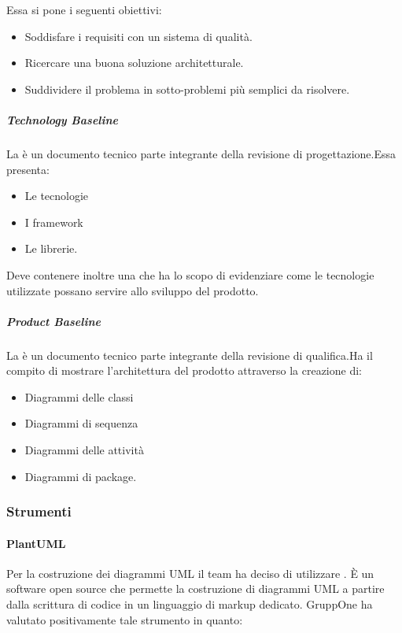 \documentclass[../norme-di-progetto.tex]{subfiles}
\begin{document}
Essa si pone i seguenti obiettivi:
\begin{itemize}
  \item Soddisfare i requisiti con un sistema di qualità.
  \item Ricercare una buona soluzione architetturale.
  \item Suddividere il problema in sotto-problemi più semplici da risolvere.
\end{itemize}

\subparagraph{Technology Baseline}%
\label{subp:technology_baseline}
La  è un documento tecnico parte integrante della revisione di progettazione.\@ Essa presenta:

\begin{itemize}
  \item Le tecnologie
  \item I framework
  \item Le librerie.
\end{itemize}
Deve contenere inoltre una  che ha lo scopo di evidenziare come le tecnologie utilizzate possano servire allo sviluppo del prodotto.

\subparagraph{Product Baseline}%
\label{subp:product_baseline}
La  è un documento tecnico parte integrante della revisione di qualifica.\@ Ha il compito di mostrare l'architettura del prodotto attraverso la creazione di:

\begin{itemize}
  \item Diagrammi delle classi
  \item Diagrammi di sequenza
  \item Diagrammi delle attività
  \item Diagrammi di package.
\end{itemize}

\subsubsection{Strumenti}%
\label{subs:strumenti}

\paragraph{PlantUML}%
\label{par:plantuml}
Per la costruzione dei diagrammi UML il team ha deciso di utilizzare \@.
È un software open source che permette la costruzione di diagrammi UML a partire dalla scrittura di codice in un linguaggio di markup dedicato. GruppOne ha valutato positivamente tale strumento in quanto:
\end{document}
